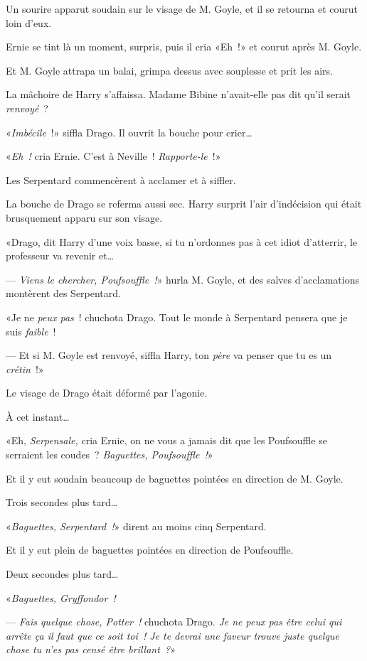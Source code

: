 Un sourire apparut soudain sur le visage de M. Goyle, et il se retourna et courut loin d'eux.

Ernie se tint là un moment, surpris, puis il cria «Eh~!» et courut après M. Goyle.

Et M. Goyle attrapa un balai, grimpa dessus avec souplesse et prit les airs.

La mâchoire de Harry s'affaissa. Madame Bibine n'avait-elle pas dit qu'il serait \emph{renvoyé}~?

«\emph{Imbécile}~!» siffla Drago. Il ouvrit la bouche pour crier…

«\emph{Eh~!} cria Ernie. C'est à Neville~! \emph{Rapporte-le}~!»

Les Serpentard commencèrent à acclamer et à siffler.

La bouche de Drago se referma aussi sec. Harry surprit l'air d'indécision qui était brusquement apparu sur son visage.

«Drago, dit Harry d'une voix basse, si tu n'ordonnes pas à cet idiot d'atterrir, le professeur va revenir et…

--- \emph{Viens le chercher, Poufsouffle~!}» hurla M. Goyle, et des salves d'acclamations montèrent des Serpentard.

«Je ne \emph{peux pas}~! chuchota Drago. Tout le monde à Serpentard pensera que je suis \emph{faible}~!

--- Et si M. Goyle est renvoyé, siffla Harry, ton \emph{père} va penser que tu es un \emph{crétin}~!»

Le visage de Drago était déformé par l'agonie.

À cet instant…

«Eh, \emph{Serpensale,} cria Ernie, on ne vous a jamais dit que les Poufsouffle se serraient les coudes~? \emph{Baguettes, Poufsouffle~!}»

Et il y eut soudain beaucoup de baguettes pointées en direction de M. Goyle.

Trois secondes plus tard…

«\emph{Baguettes, Serpentard~!}» dirent au moins cinq Serpentard.

Et il y eut plein de baguettes pointées en direction de Poufsouffle.

Deux secondes plus tard…

«\emph{Baguettes, Gryffondor~!}

--- \emph{Fais quelque chose, Potter~!} chuchota Drago. \emph{Je ne peux pas être celui qui arrête ça il faut que ce soit toi~! Je te devrai une faveur trouve juste quelque chose tu n'es pas censé être brillant~?}»

